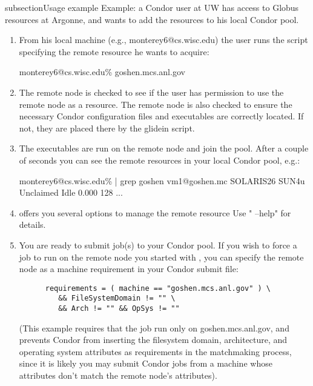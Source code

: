 subsection{Usage example}
Example: a Condor user at UW has access to Globus resources at 
Argonne, and wants to add the resources to his local Condor pool.

\begin{enumerate}

\item From his local machine (e.g., monterey6@cs.wisc.edu) the user runs 
   the  script specifying the remote resource he wants 
   to acquire:

monterey6@cs.wisc.edu\%  goshen.mcs.anl.gov

\item The remote node is checked to see if the user has permission to
   use the remote node as a resource. The remote node is also checked
   to ensure the necessary Condor configuration files and executables
   are correctly located. If not, they are placed there by the glidein
   script.

\item The executables are run on the remote node and join the pool.
   After a couple of seconds you can see the remote resources in your 
   local Condor pool, e.g.:

   monterey6@cs.wisc.edu\%  | grep goshen
      vm1@goshen.mc SOLARIS26   SUN4u  Unclaimed  Idle       0.000   128 ...

\item {} offers you several options to manage the remote resource
   Use " --help" for details.

\item You are ready to submit job(s) to your Condor pool. If you wish to force
   a job to run on the remote node you started with , you can
   specify the remote node as a machine requirement in your Condor submit
   file: 
\begin{verbatim}
      requirements = ( machine == "goshen.mcs.anl.gov" ) \
         && FileSystemDomain != "" \
         && Arch != "" && OpSys != ""
\end{verbatim}
   (This example requires that the job run only on goshen.mcs.anl.gov, and
   prevents Condor from inserting the filesystem domain, architecture, and 
   operating system attributes as requirements in the matchmaking process,
   since it is likely you may submit Condor jobs from a machine whose
   attributes don't match the remote node's attributes).

\end{enumerate}

